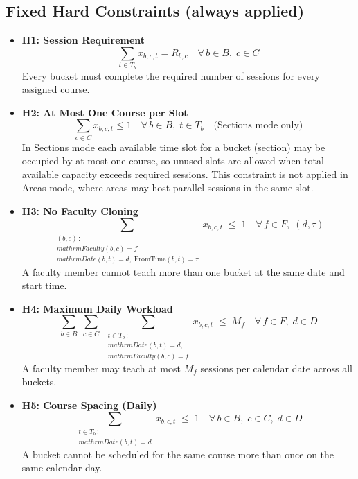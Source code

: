 \documentclass{article}
\begin{document}
\subsection{Fixed Hard Constraints (always applied)}
\begin{itemize}
    \item \textbf{H1: Session Requirement}
    \begin{equation}
        \sum_{t \in T_b} x_{b,c,t} = R_{b,c}
        \quad \forall\, b \in B,\; c \in C
    \end{equation}
    Every bucket must complete the required number of sessions for every assigned course.

    \item \textbf{H2: At Most One Course per Slot}
    \begin{equation}
        \sum_{c \in C} x_{b,c,t} \leq 1
        \quad \forall\, b \in B,\; t \in T_b \quad \text{(Sections mode only)}
    \end{equation}
    In Sections mode each available time slot for a bucket (section) may be occupied by at most one course, so unused slots are allowed when total available capacity exceeds required sessions. This constraint is not applied in Areas mode, where areas may host parallel sessions in the same slot.

    \item \textbf{H3: No Faculty Cloning}
    \begin{equation}
        \sum_{\substack{(b,c)\,:\\mathrm{Faculty}(b,c)=f\\mathrm{Date}(b,t)=d,\;
              \mathrm{FromTime}(b,t)=\tau}}
        x_{b,c,t} \;\leq\; 1
        \quad \forall\, f \in F,\;(d,\tau)
    \end{equation}
    A faculty member cannot teach more than one bucket at the same date and start time.

    \item \textbf{H4: Maximum Daily Workload}
    \begin{equation}
        \sum_{b \in B}\;\sum_{c \in C}\;
        \sum_{\substack{t \in T_b\,:\\mathrm{Date}(b,t)=d,\\mathrm{Faculty}(b,c)=f}}
        x_{b,c,t} \;\leq\; M_f
        \quad \forall\, f \in F,\; d \in D
    \end{equation}
    A faculty member may teach at most $M_f$ sessions per calendar date across all buckets.

    \item \textbf{H5: Course Spacing (Daily)}
    \begin{equation}
        \sum_{\substack{t \in T_b\,:\\mathrm{Date}(b,t)=d}}
        x_{b,c,t} \;\leq\; 1
        \quad \forall\, b \in B,\; c \in C,\; d \in D
    \end{equation}
    A bucket cannot be scheduled for the same course more than once on the same calendar day.
\end{itemize}
\end{document}
